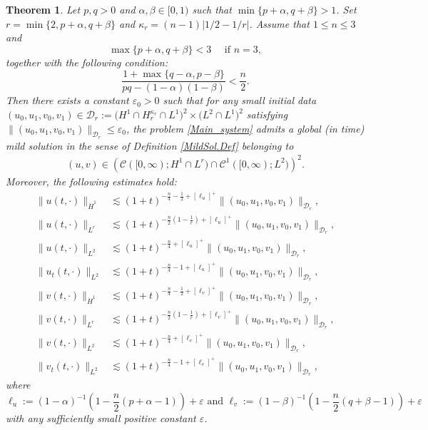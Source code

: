 \documentclass[11pt,reqno]{amsart}
\newtheorem{theorem}{Theorem}[section]
\begin{document}
	\begin{theorem}\label{Thr_1_Globalexistence}
		Let $p,q>0$ and $\alpha,\beta\in[0,1)$ such that $\min\{p+\alpha,q+\beta\}>1$. Set $r=\min\{2,p+\alpha,q+\beta\}$ and $\kappa_{r}=(n-1)|1/2-1/r|$. Assume that $1\leq n\leq3$ and
		\begin{equation}\label{con_G-N_Thr1}
			\max\{p+\alpha,q+\beta\}<3\quad \text{ if }n=3,
		\end{equation}
		together with the following condition:    \begin{equation}\label{Thr1globalexistence_Criticalcurve}
			\frac{1+ \max\{q-\alpha,p-\beta\}}{pq-(1-\alpha)(1-\beta)}< \frac{n}{2}.
		\end{equation}
		Then there exists a constant $\varepsilon_0>0$ such that for any small initial data $(u_0,u_1,v_0,v_1)\in \mathcal{D}_{r}:= \big(H^1\cap H^{\kappa_{r}}_{r} \cap L^1\big)^2 \times \big(L^2\cap L^1\big)^2$ satisfying $\|(u_0,u_1,v_0,v_1)\|_{\mathcal{D}_{r}}\leq\varepsilon_0$, the problem \eqref{Main_system} admits a global (in time) mild solution in the sense of Definition \ref{MildSol.Def} belonging to
		\begin{align*}
			(u,v)\in \left(\mathcal{C}([0,\infty); H^1 \cap L^{r})\cap \mathcal{C}^1([0,\infty);L^2)\right)^2.
		\end{align*}
		Moreover, the following estimates hold:
		\begin{align*}
			\|u(t,\cdot)\|_{\dot{H}^1} &\lesssim (1+t)^{-\frac{n}{4}-\frac{1}{2}+[\ell_u]^+} \|(u_0,u_1,v_0,v_1)\|_{\mathcal{D}_{r}},\\
			\|u(t,\cdot)\|_{L^{r}} &\lesssim (1+t)^{-\frac{n}{2}(1-\frac{1}{r})+[\ell_u]^+} \|(u_0,u_1,v_0,v_1)\|_{\mathcal{D}_{r}},\\
			\|u(t,\cdot)\|_{L^2} &\lesssim (1+t)^{-\frac{n}{4}+[\ell_u]^+}  \|(u_0,u_1,v_0,v_1)\|_{\mathcal{D}_{r}},\\
			\|u_t(t,\cdot)\|_{L^2} &\lesssim (1+t)^{-\frac{n}{4}-1+[\ell_u]^+}\|(u_0,u_1,v_0,v_1)\|_{\mathcal{D}_{r}},\\
			\|v(t,\cdot)\|_{\dot{H}^1} &\lesssim (1+t)^{-\frac{n}{4}-\frac{1}{2}+[\ell_v]^+} \|(u_0,u_1,v_0,v_1)\|_{\mathcal{D}_{r}},\\
			\|v(t,\cdot)\|_{L^{r}} &\lesssim (1+t)^{-\frac{n}{2}(1-\frac{1}{r})+[\ell_v]^+} \|(u_0,u_1,v_0,v_1)\|_{\mathcal{D}_{r}},\\
			\|v(t,\cdot)\|_{L^2} &\lesssim (1+t)^{-\frac{n}{4}+[\ell_v]^+}  \|(u_0,u_1,v_0,v_1)\|_{\mathcal{D}_{r}},\\
			\|v_t(t,\cdot)\|_{L^2} &\lesssim (1+t)^{-\frac{n}{4}-1+[\ell_v]^+}\|(u_0,u_1,v_0,v_1)\|_{\mathcal{D}_{r}},
		\end{align*}
		where
		$$\ell_u:= (1-\alpha)^{-1}\left(1-\frac{n}{2}(p+\alpha-1)\right) + \varepsilon \text{ and } \ell_v:= (1-\beta)^{-1}\left(1-\frac{n}{2}(q+\beta-1)\right) + \varepsilon$$
		with any sufficiently small positive constant $\varepsilon$.
	\end{theorem}
\end{document}

